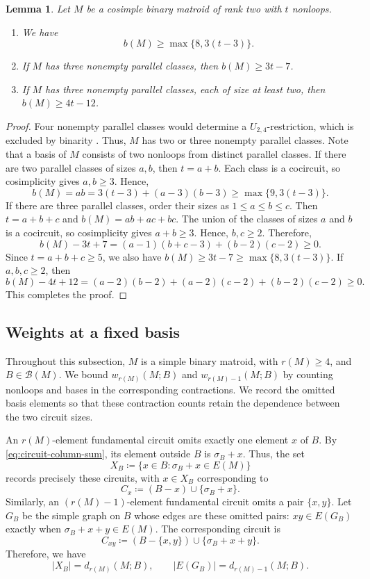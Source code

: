 \documentclass[11pt]{article}
\numberwithin{equation}{section}
\newtheorem{lemma}[lemma]{Lemma}
\newcommand{\BB}{\mathcal B}
\newcommand{\wloc}[1]{w_{#1}(M;B)}
\newcommand{\dloc}[1]{d_{#1}(M;B)}
\begin{document}
\begin{lemma}\label{lem:rank-two}
Let \(M\) be a cosimple binary matroid of rank two with \(t\)
nonloops.
\begin{enumerate}
\item[\(\mathrm{(i)}\)] We have
\[
 b(M)\ge\max\{8,3(t-3)\}.
\]
\item[\(\mathrm{(ii)}\)] If \(M\) has three nonempty parallel classes, then
\(b(M)\ge3t-7\).
\item[\(\mathrm{(iii)}\)] If \(M\) has three nonempty parallel classes,
each of size at least two, then \(b(M)\ge4t-12\).
\end{enumerate}
\end{lemma}
\begin{proof}
Four nonempty parallel classes would determine a \(U_{2,4}\)-restriction,
which is excluded by binarity \cite[Theorem~6.5.4]{Oxley2011}.
Thus, \(M\) has two or three nonempty parallel classes. Note that
a basis of \(M\) consists of two nonloops from distinct parallel
classes. If there are two parallel classes of sizes \(a,b\), then
\(t=a+b\). Each class is a cocircuit, so cosimplicity gives
\(a,b\ge3\). Hence,
\[
 b(M)=ab=3(t-3)+(a-3)(b-3)\ge\max\{9,3(t-3)\}.
\]
If there are three parallel classes, order their sizes as
\(1\le a\le b\le c\). Then \(t=a+b+c\) and
\(b(M)=ab+ac+bc\). The union of the classes of sizes \(a\) and \(b\)
is a cocircuit, so cosimplicity gives \(a+b\ge3\). Hence,
\(b,c\ge2\). Therefore,
\[
 b(M)-3t+7
 =(a-1)(b+c-3)+(b-2)(c-2)\ge0.
\]
Since \(t=a+b+c\ge5\), we also have
\(b(M)\ge3t-7\ge\max\{8,3(t-3)\}\).
If \(a,b,c\ge2\), then
\[
 b(M)-4t+12
 =(a-2)(b-2)+(a-2)(c-2)+(b-2)(c-2)\ge0.
\]
This completes the proof.
\end{proof}

\subsection{Weights at a fixed basis}

Throughout this subsection, \(M\) is a simple binary matroid,
with \(r(M)\ge4\), and \(B\in\BB(M)\).
We bound \(\wloc{r(M)}\) and \(\wloc{r(M)-1}\) by counting
nonloops and bases in the corresponding contractions.
We record the omitted basis elements so that these contraction
counts retain the dependence between the two circuit sizes.

An \(r(M)\)-element fundamental circuit omits exactly one
element \(x\) of \(B\). By \eqref{eq:circuit-column-sum}, its
element outside \(B\) is \(\sigma_B+x\). Thus, the set
\[
 X_B\coloneqq\{x\in B:\sigma_B+x\in E(M)\}
\]
records precisely
these circuits, with \(x\in X_B\) corresponding to
\[
 C_x\coloneqq(B-x)\cup\{\sigma_B+x\}.
\]
Similarly, an \((r(M)-1)\)-element fundamental circuit omits
a pair \(\{x,y\}\). Let \(G_B\) be the simple graph on \(B\)
whose edges are these omitted pairs: \(xy\in E(G_B)\) exactly
when \(\sigma_B+x+y\in E(M)\). The corresponding circuit is
\[
 C_{xy}\coloneqq(B-\{x,y\})\cup\{\sigma_B+x+y\}.
\]
Therefore, we have
\begin{equation}\label{eq:graph-counts}
 |X_B|=\dloc{r(M)},\qquad |E(G_B)|=\dloc{r(M)-1}.
\end{equation}
\end{document}
